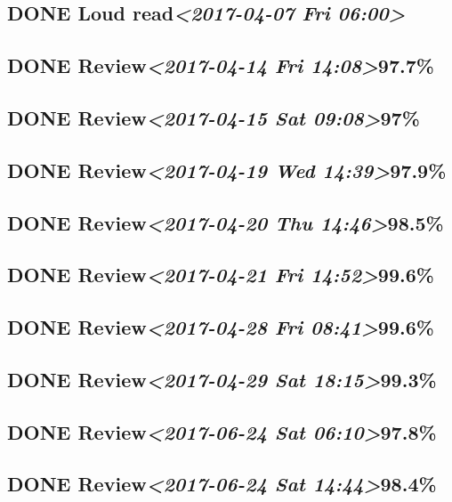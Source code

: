 \documentclass[11pt]{ctexart}
\begin{document}
\subsection{{\bfseries\sffamily DONE} Loud read\textit{<2017-04-07 Fri 06:00>}}
\label{sec:org047c728}
\subsection{{\bfseries\sffamily DONE} Review\textit{<2017-04-14 Fri 14:08>}97.7\%}
\label{sec:orge217ce7}
\subsection{{\bfseries\sffamily DONE} Review\textit{<2017-04-15 Sat 09:08>}97\%}
\label{sec:org96acc4f}
\subsection{{\bfseries\sffamily DONE} Review\textit{<2017-04-19 Wed 14:39>}97.9\%}
\label{sec:org551f110}
\subsection{{\bfseries\sffamily DONE} Review\textit{<2017-04-20 Thu 14:46>}98.5\%}
\label{sec:org4f7d889}
\subsection{{\bfseries\sffamily DONE} Review\textit{<2017-04-21 Fri 14:52>}99.6\%}
\label{sec:orgca40ba8}
\subsection{{\bfseries\sffamily DONE} Review\textit{<2017-04-28 Fri 08:41>}99.6\%}
\label{sec:orge81e967}
\subsection{{\bfseries\sffamily DONE} Review\textit{<2017-04-29 Sat 18:15>}99.3\%}
\label{sec:orgbbf0a73}
\subsection{{\bfseries\sffamily DONE} Review\textit{<2017-06-24 Sat 06:10>}97.8\%}
\label{sec:org67e0f69}
\subsection{{\bfseries\sffamily DONE} Review\textit{<2017-06-24 Sat 14:44>}98.4\%}
\label{sec:org39cd837}
\end{document}
